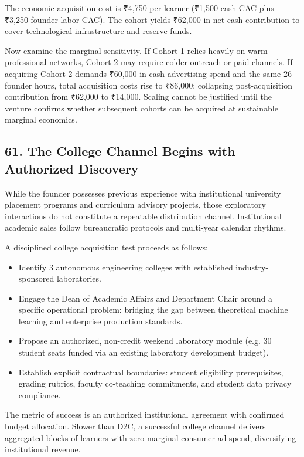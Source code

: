The economic acquisition cost is ₹4,750 per learner (₹1,500 cash CAC plus ₹3,250 founder-labor CAC). The cohort yields ₹62,000 in net cash contribution to cover technological infrastructure and reserve funds.

Now examine the marginal sensitivity. If Cohort 1 relies heavily on warm professional networks, Cohort 2 may require colder outreach or paid channels. If acquiring Cohort 2 demands ₹60,000 in cash advertising spend and the same 26 founder hours, total acquisition costs rise to ₹86,000: collapsing post-acquisition contribution from ₹62,000 to ₹14,000. Scaling cannot be justified until the venture confirms whether subsequent cohorts can be acquired at sustainable marginal economics.

\subsection*{61. The College Channel Begins with Authorized Discovery}

While the founder possesses previous experience with institutional university placement programs and curriculum advisory projects, those exploratory interactions do not constitute a repeatable distribution channel. Institutional academic sales follow bureaucratic protocols and multi-year calendar rhythms.

A disciplined college acquisition test proceeds as follows:
\begin{itemize}[leftmargin=*,itemsep=1pt]
  \item Identify 3 autonomous engineering colleges with established industry-sponsored laboratories.
  \item Engage the Dean of Academic Affairs and Department Chair around a specific operational problem: bridging the gap between theoretical machine learning and enterprise production standards.
  \item Propose an authorized, non-credit weekend laboratory module (e.g. 30 student seats funded via an existing laboratory development budget).
  \item Establish explicit contractual boundaries: student eligibility prerequisites, grading rubrics, faculty co-teaching commitments, and student data privacy compliance.
\end{itemize}

The metric of success is an authorized institutional agreement with confirmed budget allocation. Slower than D2C, a successful college channel delivers aggregated blocks of learners with zero marginal consumer ad spend, diversifying institutional revenue.

